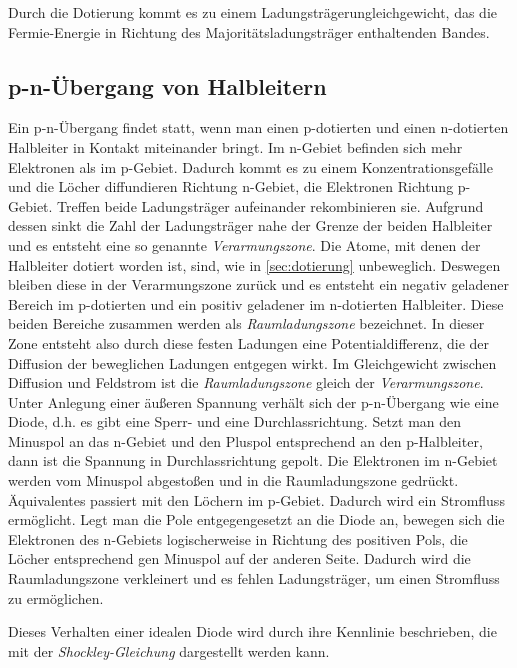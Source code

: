 \documentclass[slug=SZ, room=Hermann-Krone-Bau\,\ Labor\ 1.25,
supervisor=Martin\ Kroll, coursedate=14.\ 11.\ 2019]{../../Lab_Report_LaTeX/lab_report}
\begin{document}
Durch die Dotierung kommt es zu einem Ladungsträgerungleichgewicht, das die Fermie-Energie in Richtung des
Majoritätsladungsträger enthaltenden Bandes.

\subsection{p-n-Übergang von Halbleitern}
\label{sec:pnüber}

Ein p-n-Übergang findet statt, wenn man einen p-dotierten und einen n-dotierten Halbleiter in Kontakt miteinander
bringt. Im n-Gebiet befinden sich mehr Elektronen als im p-Gebiet. Dadurch kommt es zu einem Konzentrationsgefälle
und die Löcher diffundieren Richtung n-Gebiet, die Elektronen Richtung p-Gebiet. Treffen beide Ladungsträger
aufeinander rekombinieren sie. Aufgrund dessen sinkt die Zahl der Ladungsträger nahe der Grenze der beiden
Halbleiter und es entsteht eine so genannte \emph{Verarmungszone}. Die Atome, mit denen der Halbleiter
dotiert worden ist, sind, wie in \ref{sec:dotierung} unbeweglich. Deswegen bleiben diese in der Verarmungszone
zurück und es entsteht ein negativ geladener Bereich im p-dotierten und ein positiv geladener im
n-dotierten Halbleiter. Diese beiden Bereiche zusammen werden als \emph{Raumladungszone} bezeichnet.
In dieser Zone entsteht also durch diese festen Ladungen eine Potentialdifferenz, die der Diffusion der
beweglichen Ladungen entgegen wirkt. Im Gleichgewicht zwischen Diffusion und Feldstrom ist die
\emph{Raumladungszone} gleich der \emph{Verarmungszone}.\\

Unter Anlegung einer äußeren Spannung verhält sich der p-n-Übergang wie eine Diode, d.h. es gibt eine Sperr-
und eine Durchlassrichtung.
Setzt man den Minuspol an das n-Gebiet und den Pluspol entsprechend an den p-Halbleiter, dann ist die Spannung
in Durchlassrichtung gepolt. Die Elektronen im n-Gebiet werden vom Minuspol abgestoßen und in die Raumladungszone
gedrückt. Äquivalentes passiert mit den Löchern im p-Gebiet. Dadurch wird ein Stromfluss ermöglicht.
Legt man die Pole entgegengesetzt an die Diode an, bewegen sich die Elektronen des n-Gebiets logischerweise in
Richtung des positiven Pols, die Löcher entsprechend gen Minuspol auf der anderen Seite. Dadurch wird die
Raumladungszone verkleinert und es fehlen Ladungsträger, um einen Stromfluss zu ermöglichen.

Dieses Verhalten einer idealen Diode wird durch ihre Kennlinie beschrieben, die mit der \emph{Shockley-Gleichung}
dargestellt werden kann.
\end{document}
